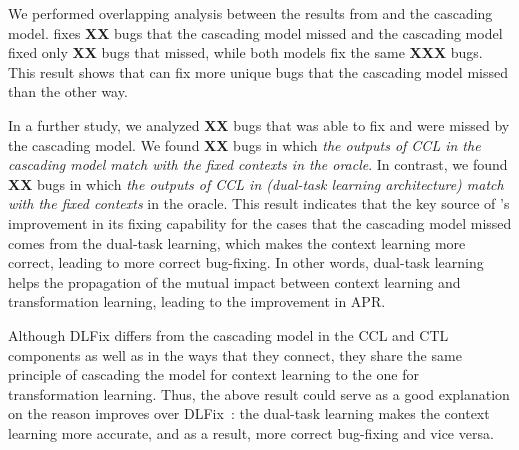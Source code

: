We performed overlapping analysis between the results
from {\tool} and the cascading model. {\tool} fixes {\bf XX} bugs that
the cascading model missed and the cascading model fixed only {\bf XX}
bugs that {\tool} missed, while both models fix the same {\bf XXX}
bugs. This result shows that {\tool} can fix more unique bugs
that the cascading model missed than the other way.

In a further study, we analyzed {\bf XX} bugs that {\tool} was able to
fix and were missed by the cascading model. We found {\bf XX} bugs in
which {\em the outputs of CCL in the cascading model match with the
  fixed contexts in the oracle}. In contrast, we found {\bf XX} bugs
in which {\em the outputs of CCL in {\tool} (dual-task learning
  architecture) match with the fixed contexts} in the oracle. This
result indicates that the key source of {\tool}'s improvement in its
fixing capability for the cases that the cascading model missed comes
from the dual-task learning, which makes the context learning more
correct, leading to more correct bug-fixing. In other words, dual-task
learning helps the propagation of the mutual impact between context
learning and transformation learning, leading to the improvement in
APR.

Although DLFix differs from the cascading model in the CCL and CTL
components as well as in the ways that they connect, they share the
same principle of cascading the model for context learning to the one
for transformation learning. Thus, the above result could serve as a
good explanation on the reason {\tool} improves over
DLFix~\cite{icse20}: the dual-task learning makes the context learning
more accurate, and as a result, more correct bug-fixing and vice
versa.







